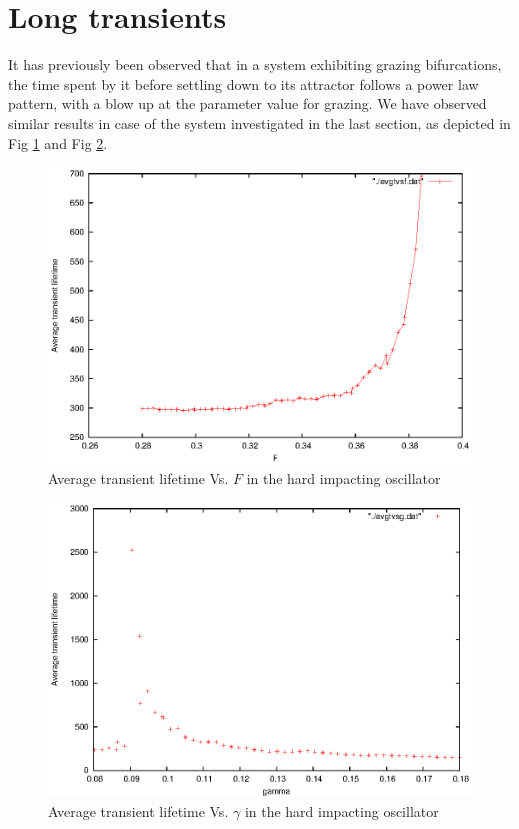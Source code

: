 \documentclass{book}
\renewcommand{\(}{\begin{columns}}
\renewcommand{\)}{\end{columns}}
\newcommand{\<}[1]{\begin{column}{#1}}
\renewcommand{\>}{\end{column}}
\begin{document}
\section{Long transients}
It has previously been observed that in a system exhibiting grazing 
bifurcations, the time spent by it before settling down to its attractor 
follows a power law pattern, with a blow up at the parameter value for 
grazing.  We have observed similar results in case of  the system investigated 
in the last section, as depicted in Fig \ref{fig-tvsf} and Fig \ref{fig-tvsg}. 

\begin{figure}[!htb]
\caption{Average transient lifetime Vs.  $F$ in the hard impacting oscillator}
\label{fig-tvsf}
\begin{center}
\includegraphics[width=0.7\columnwidth]{avgtauvsf-wofit}
\end{center}
\end{figure}

\begin{figure}[!htp]
\caption{Average transient lifetime Vs.  $\gamma$ in the hard impacting oscillator}
\label{fig-tvsg}
\begin{center}
\includegraphics[width=0.7\columnwidth]{avgtauvsg-wofit}
\end{center}
\end{figure}
\end{document}
